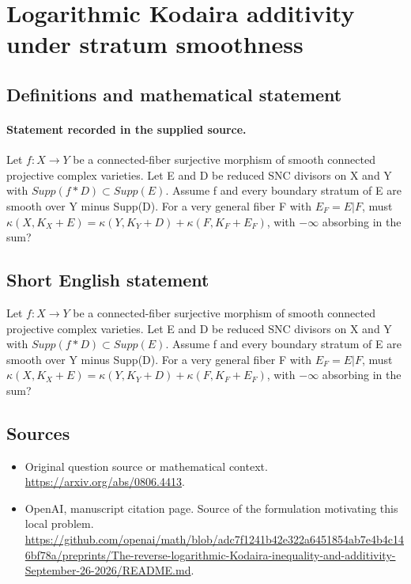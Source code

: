 \documentclass[11pt]{article}
\begin{document}
\section*{Logarithmic Kodaira additivity under stratum smoothness}\label{30007043}
\subsection{Definitions and mathematical statement}
\paragraph{Statement recorded in the supplied source.}
Let $f:X\to Y$ be a connected-fiber surjective morphism of smooth connected projective complex varieties. Let E and D be reduced SNC divisors on X and Y with $Supp(f*D)\subset Supp(E)$. Assume f and every boundary stratum of E are smooth over Y minus Supp(D). For a very general fiber F with $E_F=E|F$, must $\kappa (X,K_X+E)=\kappa (Y,K_Y+D)+\kappa (F,K_F+E_F)$, with $-\infty $ absorbing in the sum?
\subsection{Short English statement}
Let $f:X\to Y$ be a connected-fiber surjective morphism of smooth connected projective complex varieties. Let E and D be reduced SNC divisors on X and Y with $Supp(f*D)\subset Supp(E)$. Assume f and every boundary stratum of E are smooth over Y minus Supp(D). For a very general fiber F with $E_F=E|F$, must $\kappa (X,K_X+E)=\kappa (Y,K_Y+D)+\kappa (F,K_F+E_F)$, with $-\infty $ absorbing in the sum?
\subsection{Sources}
\begin{itemize}
\item[S1] Original question source or mathematical context.
\url{https://arxiv.org/abs/0806.4413}.
\item[S2] OpenAI, manuscript citation page. Source of the formulation motivating this local problem.
\url{https://github.com/openai/math/blob/adc7f1241b42e322a6451854ab7e4b4c146bf78a/preprints/The-reverse-logarithmic-Kodaira-inequality-and-additivity-September-26-2026/README.md}.
\end{itemize}
\end{document}

